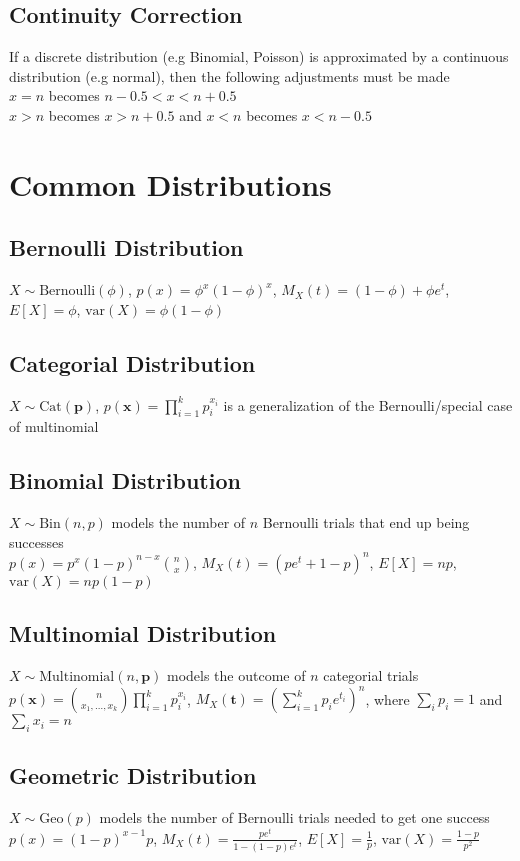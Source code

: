 \documentclass{article}
\newcommand{\V}{\mbox{var}}
\begin{document}
\subsection{Continuity Correction}
If a discrete distribution (e.g Binomial, Poisson) is approximated by a continuous distribution (e.g normal), then the following adjustments must be made  \\
$x = n$ becomes $n-0.5 < x < n + 0.5$ \\
$x > n$ becomes $x > n + 0.5$ and $x < n $ becomes $x < n - 0.5$ 

\section{Common Distributions}
\subsection{Bernoulli Distribution}
$X\sim \mbox{Bernoulli}(\phi)$, $p(x) = \phi^x(1-\phi)^x$, $M_X(t) = (1-\phi) + \phi e^t$, $E[X] = \phi$, $\V(X) = \phi(1-\phi)$

\subsection{Categorial Distribution}
$X\sim \mbox{Cat}(\boldsymbol p)$, $p(\boldsymbol x) = \prod\limits_{i=1}^kp_i^{x_i}$ is a generalization of the Bernoulli/special case of multinomial

\subsection{Binomial Distribution}
$X\sim \mbox{Bin}(n, p)$ models the number of $n$ Bernoulli trials that end up being successes \\
$p(x) = p^x(1-p)^{n-x}\binom{n}{x}$, $M_X(t) = (pe^t + 1 - p)^n$, $E[X] = np$, $\V(X) = np(1-p)$

\subsection{Multinomial Distribution}
$X\sim \mbox{Multinomial}(n, \boldsymbol p)$ models the outcome of $n$ categorial trials \\
$p(\boldsymbol x) = \binom{n}{x_1, \ldots, x_k} \prod\limits_{i=1}^k p_i^{x_i}$, $M_X(\boldsymbol t) = (\sum\limits_{i=1}^k p_i e^{t_i})^n$, where $\sum_i p_i = 1$ and $\sum_i x_i = n$

\subsection{Geometric Distribution}
$X \sim \mbox{Geo}(p)$ models the number of Bernoulli trials needed to get one success \\
$p(x) = (1-p)^{x-1}p$, $M_X(t) = \frac{pe^t}{1-(1-p)e^t}$, $E[X] = \frac{1}{p}$, $\V(X) = \frac{1-p}{p^2}$
\end{document}
